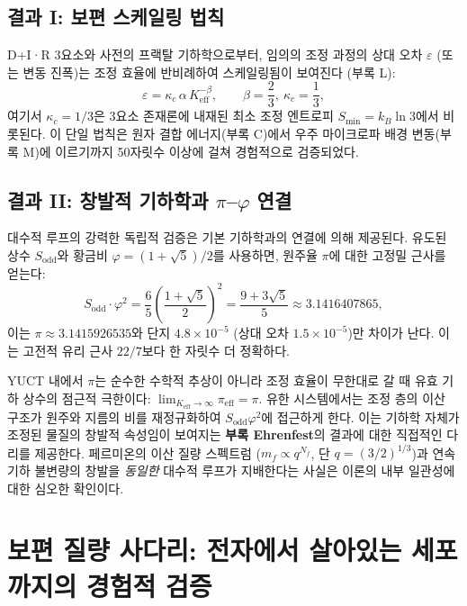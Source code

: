 \documentclass[11pt,a4paper]{article}
\begin{document}
	\subsection{결과 I: 보편 스케일링 법칙}
	\label{subsec:consequence-scaling}
	
	D+I·R 3요소와 사전의 프랙탈 기하학으로부터, 임의의 조정 과정의 상대 오차 $\varepsilon$ (또는 변동 진폭)는 조정 효율에 반비례하여 스케일링됨이 보여진다 (부록 L):
	\[
	\boxed{\varepsilon = \kappa_c \, \alpha \, K_{\mathrm{eff}}^{-\beta}, \qquad \beta = \frac{2}{3},\ \kappa_c = \frac{1}{3}},
	\]
	여기서 $\kappa_c = 1/3$은 3요소 존재론에 내재된 최소 조정 엔트로피 $S_{\min} = k_B \ln 3$에서 비롯된다. 이 단일 법칙은 원자 결합 에너지(부록 C)에서 우주 마이크로파 배경 변동(부록 M)에 이르기까지 50자릿수 이상에 걸쳐 경험적으로 검증되었다.
	
	\subsection{결과 II: 창발적 기하학과 $\pi$–$\varphi$ 연결}
	\label{subsec:consequence-geometry}
	
	대수적 루프의 강력한 독립적 검증은 기본 기하학과의 연결에 의해 제공된다. 유도된 상수 $S_{\mathrm{odd}}$와 황금비 $\varphi = (1+\sqrt{5})/2$를 사용하면, 원주율 $\pi$에 대한 고정밀 근사를 얻는다:
	\[
	S_{\mathrm{odd}} \cdot \varphi^2 = \frac{6}{5} \left( \frac{1+\sqrt{5}}{2} \right)^2 = \frac{9+3\sqrt{5}}{5} \approx 3.1416407865,
	\]
	이는 $\pi \approx 3.1415926535$와 단지 $4.8 \times 10^{-5}$ (상대 오차 $1.5 \times 10^{-5}$)만 차이가 난다. 이는 고전적 유리 근사 $22/7$보다 한 자릿수 더 정확하다.
	
	YUCT 내에서 $\pi$는 순수한 수학적 추상이 아니라 조정 효율이 무한대로 갈 때 유효 기하 상수의 점근적 극한이다: $\lim_{K_{\mathrm{eff}} \to \infty} \pi_{\mathrm{eff}} = \pi$. 유한 시스템에서는 조정 층의 이산 구조가 원주와 지름의 비를 재정규화하여 $S_{\mathrm{odd}}\varphi^2$에 접근하게 한다. 이는 기하학 자체가 조정된 물질의 창발적 속성임이 보여지는 \textbf{부록 Ehrenfest}의 결과에 대한 직접적인 다리를 제공한다. 페르미온의 이산 질량 스펙트럼 ($m_f \propto q^{N_f}$, 단 $q = (3/2)^{1/3}$)과 연속 기하 불변량의 창발을 \emph{동일한} 대수적 루프가 지배한다는 사실은 이론의 내부 일관성에 대한 심오한 확인이다.
	
	\section{보편 질량 사다리: 전자에서 살아있는 세포까지의 경험적 검증}
	\label{sec:mass_ladder}
	
\end{document}
